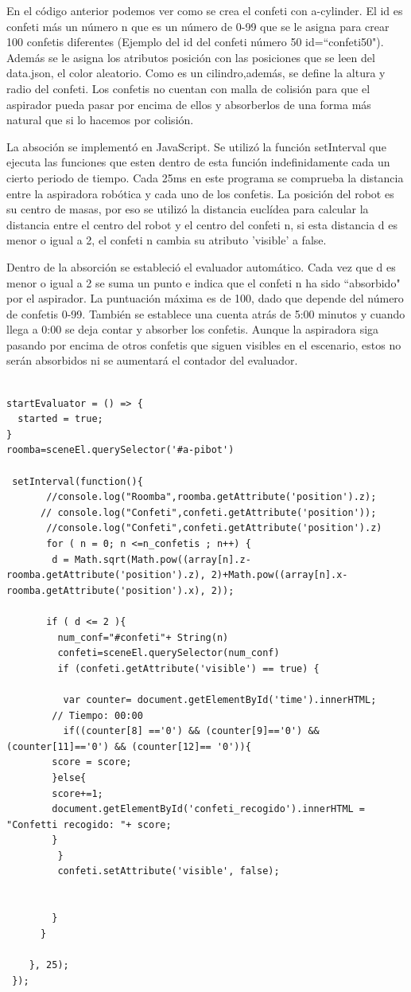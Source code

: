 En el código anterior podemos ver como se crea el confeti  con  a-cylinder. El id es confeti más un número  n que es un número de 0-99 que se le asigna para crear 100 confetis diferentes (Ejemplo  del id del confeti número 50   id=``confeti50"). Además se le asigna los atributos posición con las posiciones que se leen del data.json, el color aleatorio. Como es un cilindro,además, se define la altura y radio del confeti.
Los confetis no cuentan con malla de colisión para que el aspirador pueda pasar por encima de ellos y absorberlos de una forma más natural que si lo hacemos por colisión.

La absoción se implementó en JavaScript. Se utilizó la función setInterval que ejecuta las funciones que esten dentro de esta función  indefinidamente cada un cierto periodo de tiempo.
Cada 25ms en este programa se comprueba la distancia entre la aspiradora robótica y cada uno de los confetis. La posición del robot es su centro de masas, por eso se  utilizó la distancia euclídea para calcular la distancia entre el centro del robot y el centro del confeti n, si esta distancia d es menor o igual a 2, el confeti n cambia su atributo 'visible' a false. 


Dentro de la absorción se estableció el evaluador automático. Cada vez que d es menor o igual a 2 se suma un punto e indica que el confeti n ha sido  ``absorbido" por el aspirador. La puntuación máxima es de 100, dado que depende del número de confetis 0-99. También se establece una cuenta atrás de 5:00 minutos y cuando llega a 0:00 se deja contar y absorber los confetis. Aunque la aspiradora siga pasando por encima de otros confetis que siguen visibles en el escenario, estos no serán absorbidos ni se aumentará el contador del evaluador.

\begin{lstlisting}

startEvaluator = () => {
  started = true;
}
roomba=sceneEl.querySelector('#a-pibot')

 setInterval(function(){
       //console.log("Roomba",roomba.getAttribute('position').z);
      // console.log("Confeti",confeti.getAttribute('position'));
       //console.log("Confeti",confeti.getAttribute('position').z)
       for ( n = 0; n <=n_confetis ; n++) {
        d = Math.sqrt(Math.pow((array[n].z-roomba.getAttribute('position').z), 2)+Math.pow((array[n].x-roomba.getAttribute('position').x), 2));

       if ( d <= 2 ){
         num_conf="#confeti"+ String(n)
         confeti=sceneEl.querySelector(num_conf)
         if (confeti.getAttribute('visible') == true) {
	      
	      var counter= document.getElementById('time').innerHTML;
		// Tiempo: 00:00	
	      if((counter[8] =='0') && (counter[9]=='0') && (counter[11]=='0') && (counter[12]== '0')){      
		score = score;
		}else{
		score+=1;
		document.getElementById('confeti_recogido').innerHTML = "Confetti recogido: "+ score;
		}
         }
         confeti.setAttribute('visible', false);


        }
      }
	
    }, 25);
 });
\end{lstlisting}


